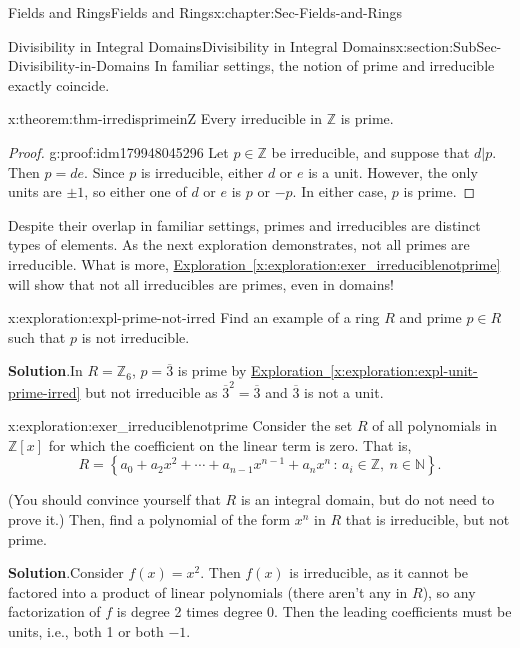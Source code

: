 \documentclass[oneside,10pt,]{book}
\newcommand{\blocktitlefont}{\relax}
\newcommand{\xreffont}{\relax}
\numberwithin{equation}{section}
\newcommand{\setof}[2]{{\left\{#1\,\colon\,#2\right\}}}
\def\Z{{\mathbb Z}}
\def\N{{\mathbb N}}
\begin{document}
\begin{chapterptx}{Fields and Rings}{}{Fields and Rings}{}{}{x:chapter:Sec-Fields-and-Rings}
\begin{sectionptx}{Divisibility in Integral Domains}{}{Divisibility in Integral Domains}{}{}{x:section:SubSec-Divisibility-in-Domains}
In familiar settings, the notion of prime and irreducible exactly coincide.%
\begin{theorem}{}{}{x:theorem:thm-irredisprimeinZ}%
Every irreducible in \(\Z\) is prime.%
\end{theorem}
\begin{proof}{}{g:proof:idm179948045296}
Let \(p\in \Z\) be irreducible, and suppose that \(d|p\). Then \(p = de\). Since \(p\) is irreducible, either \(d\) or \(e\) is a unit. However, the only units are \(\pm 1\), so either one of \(d\) or \(e\) is \(p\) or \(-p\). In either case, \(p\) is prime.%
\end{proof}
Despite their overlap in familiar settings, primes and irreducibles are distinct types of elements. As the next exploration demonstrates, not all primes are irreducible. What is more, \hyperref[x:exploration:exer_irreduciblenotprime]{Exploration~{\xreffont\ref{x:exploration:exer_irreduciblenotprime}}} will show that not all irreducibles are primes, even in domains!%
\begin{exploration}{}{x:exploration:expl-prime-not-irred}%
Find an example of a ring \(R\) and prime \(p\in R\) such that \(p\) is not irreducible.%
\par\smallskip%
\noindent\textbf{\blocktitlefont Solution}.\hypertarget{g:solution:idm179948035504}{}\quad{}In \(R = \Z_6\), \(p = \overline{3}\) is prime by \hyperref[x:exploration:expl-unit-prime-irred]{Exploration~{\xreffont\ref{x:exploration:expl-unit-prime-irred}}} but not irreducible as \(\overline{3}^2 = \overline{3}\) and \(\overline{3}\) is not a unit.%
\end{exploration}
\begin{exploration}{}{x:exploration:exer_irreduciblenotprime}%
Consider the set \(R\) of all polynomials in \(\Z[x]\) for which the coefficient on the linear term is zero. That is,%
\begin{equation*}
R = \setof{a_0 + a_2 x^2 + \cdots + a_{n-1} x^{n-1} + a_n x^n}{a_i\in \Z,\ n\in\N}\text{.}
\end{equation*}
%
\par
(You should convince yourself that \(R\) is an integral domain, but do not need to prove it.) Then, find a polynomial of the form \(x^n\) in \(R\) that is irreducible, but not prime.%
\par\smallskip%
\noindent\textbf{\blocktitlefont Solution}.\hypertarget{g:solution:idm179948028768}{}\quad{}Consider \(f(x) = x^2\). Then \(f(x)\) is irreducible, as it cannot be factored into a product of linear polynomials (there aren't any in \(R\)), so any factorization of \(f\) is degree 2 times degree 0. Then the leading coefficients must be units, i.e., both 1 or both \(-1\).%

\end{exploration}
\end{sectionptx}
\end{chapterptx}
\end{document}
